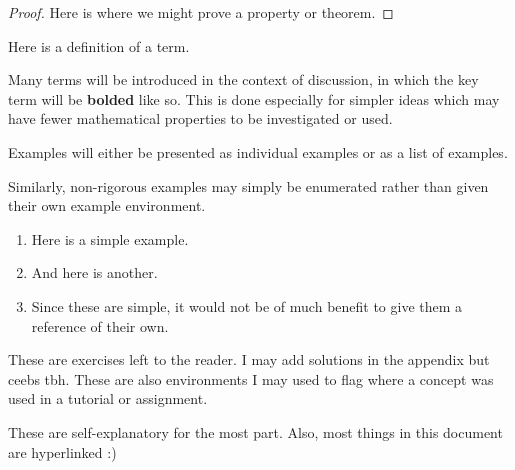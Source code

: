 \begin{proof}%
    Here is where we might prove a property or theorem. 
\end{proof}


\begin{definition}\label{defn:}
    Here is a definition of a term. 
\end{definition}
Many terms will be introduced in the context of discussion, 
in which the key term will be \textbf{bolded} like so. 
This is done especially for simpler ideas which may have 
fewer mathematical properties to be investigated 
or used. 

\begin{example}
    Examples will either be presented as individual 
    examples or as a list of examples. 
\end{example}
Similarly, non-rigorous examples may simply be enumerated 
rather than given their own example environment. 
\begin{enumerate}
    \item Here is a simple example. 
    \item And here is another. 
    \item Since these are simple, it would not be 
    of much benefit to give them a reference of their own.
\end{enumerate}
\begin{exercise}
    These are exercises left to the reader. I may add solutions 
    in the appendix but ceebs tbh. These are also environments I may used to flag where a concept was used in a tutorial or assignment. 
\end{exercise}

These are self-explanatory for the most part. 
Also, most things in this document are hyperlinked :)
